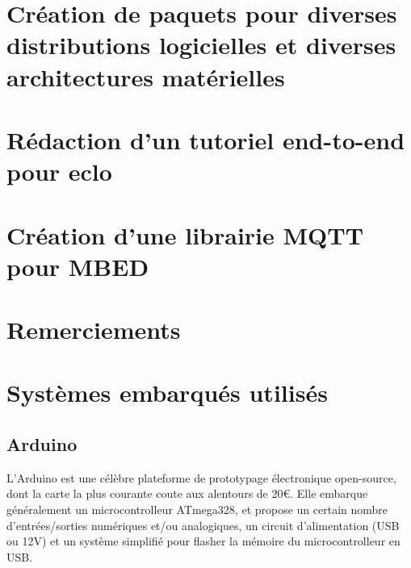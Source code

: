 \documentclass{article}
\begin{document}
\clearpage

\section{Création de paquets pour diverses distributions logicielles et diverses architectures matérielles}

\clearpage

\section{Rédaction d’un tutoriel end-to-end pour eclo}

\clearpage

\section{Création d’une librairie MQTT pour MBED}

\clearpage

\section{Remerciements}

\clearpage

\appendix
\section{Systèmes embarqués utilisés}

\subsection{Arduino}
\label{arduino}

L’Arduino est une célèbre plateforme de prototypage électronique open-source, dont la carte la plus courante coute aux alentours de 20€.
Elle embarque généralement un microcontrolleur ATmega328, et propose un certain nombre d’entrées/sorties numériques et/ou analogiques, un circuit d’alimentation (USB ou 12V) et un système simplifié pour flasher la mémoire du microcontrolleur en USB.
\end{document}
